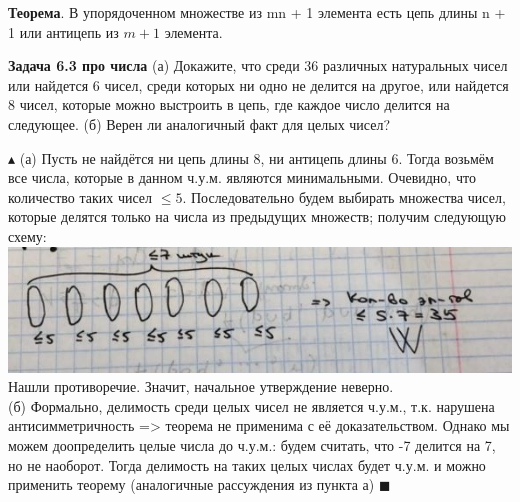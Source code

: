 \textbf{Теорема}. В упорядоченном множестве из mn + 1 элемента есть цепь длины n + 1 или антицепь из $m + 1$ элемента. \par
\textbf{Задача 6.3 про числа} (а) Докажите, что среди 36 различных натуральных чисел или найдется 6 чисел, среди которых ни одно не делится на другое, или найдется 8 чисел, которые можно выстроить в цепь, где каждое число делится на следующее. (б) Верен ли аналогичный факт для целых чисел? \par
$\blacktriangle$
(а) Пусть не найдётся ни цепь длины 8, ни антицепь длины 6. Тогда возьмём все числа, которые в данном ч.у.м. являются минимальными. Очевидно, что количество таких чисел $\leqslant 5$. Последовательно будем выбирать множества чисел, которые делятся только на числа из предыдущих множеств; получим следующую схему: \\ 
\includegraphics{images/20} \\

Нашли противоречие. Значит, начальное утверждение неверно. \\
(б) Формально, делимость среди целых чисел не является ч.у.м., т.к. нарушена антисимметричность => теорема не применима с её доказательством. Однако мы можем доопределить целые числа до ч.у.м.: будем считать, что -7 делится на 7, но не наоборот. Тогда делимость на таких целых числах будет ч.у.м. и можно применить теорему (аналогичные рассуждения из пункта а)
$\blacksquare$